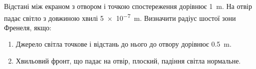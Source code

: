 %
%
^^I^^IВідстані між екраном з отвором і точкою спостереження дорівнює \SI{1}{\metre}. На отвір падає світло з довжиною хвилі \SI{5e-7}{\metre}. Визначити радіус шостої зони Френеля, якщо:
^^I^^I\begin{enumerate}
^^I^^I^^I\item Джерело світла точкове і відстань до нього до отвору дорівнює \SI{0.5}{\metre}.
^^I^^I^^I\item Хвильовий фронт, що падає на отвір, плоский, падіння світла нормальне.
^^I^^I\end{enumerate}
